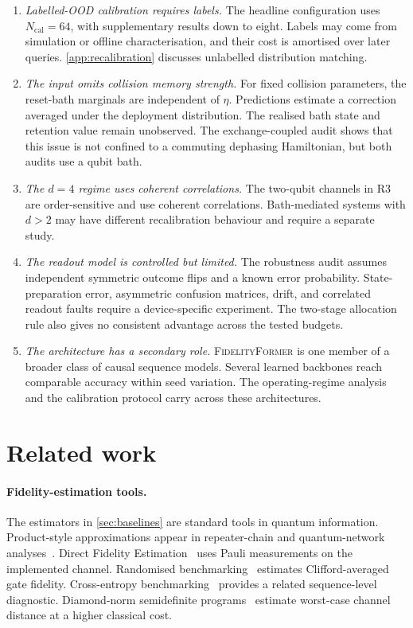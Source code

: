 \documentclass[12pt]{iopart}
\newcommand{\fidno}{\textsc{FidelityFormer}}
\begin{document}
\begin{enumerate}[itemsep=2pt,topsep=2pt,leftmargin=*]
\item \emph{Labelled-OOD calibration requires labels.}
The headline configuration uses $N_{\mathrm{cal}}=64$, with supplementary results down to eight. Labels may come from simulation or offline characterisation, and their cost is amortised over later queries. \ref{app:recalibration} discusses unlabelled distribution matching.

\item \emph{The input omits collision memory strength.}
For fixed collision parameters, the reset-bath marginals are independent of $\eta$. Predictions estimate a correction averaged under the deployment distribution. The realised bath state and retention value remain unobserved. The exchange-coupled audit shows that this issue is not confined to a commuting dephasing Hamiltonian, but both audits use a qubit bath.

\item \emph{The $d=4$ regime uses coherent correlations.}
The two-qubit channels in R3 are order-sensitive and use coherent correlations. Bath-mediated systems with $d>2$ may have different recalibration behaviour and require a separate study.

\item \emph{The readout model is controlled but limited.}
The robustness audit assumes independent symmetric outcome flips and a known error probability. State-preparation error, asymmetric confusion matrices, drift, and correlated readout faults require a device-specific experiment. The two-stage allocation rule also gives no consistent advantage across the tested budgets.

\item \emph{The architecture has a secondary role.}
\fidno{} is one member of a broader class of causal sequence models. Several learned backbones reach comparable accuracy within seed variation. The operating-regime analysis and the calibration protocol carry across these architectures.
\end{enumerate}


\section{Related work}
\label{sec:related}

\paragraph*{Fidelity-estimation tools.}
The estimators in \cref{sec:baselines} are standard tools in quantum information. Product-style approximations appear in repeater-chain and quantum-network analyses~\cite{repeater_review}. Direct Fidelity Estimation~\cite{flammia_liu_2011} uses Pauli measurements on the implemented channel. Randomised benchmarking~\cite{rb_review,rb_recent} estimates Clifford-averaged gate fidelity. Cross-entropy benchmarking~\cite{xeb_review} provides a related sequence-level diagnostic. Diamond-norm semidefinite programs~\cite{watrous_dnorm_sdp} estimate worst-case channel distance at a higher classical cost.
\end{document}
